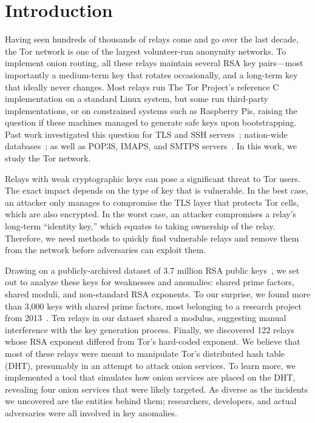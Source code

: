 \section{Introduction}
Having seen hundreds of thousands of relays come and go over the last decade,
the Tor network is one of the largest volunteer-run anonymity networks.  To
implement onion routing, all these relays maintain several RSA key pairs---most
importantly a medium-term key that rotates occasionally, and a long-term key
that ideally never changes.  Most relays run The Tor Project's reference
C implementation on a standard Linux system, but some run third-party
implementations, or on constrained systems such as Raspberry Pis, raising the
question if these machines managed to generate safe keys upon bootstrapping.
Past work investigated this question for TLS and SSH
servers~\cite{Heninger2012a}; nation-wide databases~\cite{Bernstein2013a}; as
well as POP3S, IMAPS, and SMTPS servers~\cite{Hastings2016a}.  In this work, we
study the Tor network.

Relays with weak cryptographic keys can pose a significant threat to Tor users.
The exact impact depends on the type of key that is vulnerable.  In the best
case, an attacker only manages to compromise the TLS layer that protects Tor
cells, which are also encrypted.  In the worst case, an attacker compromises a
relay's long-term ``identity key,'' which equates to taking ownership of the relay.
Therefore, we need methods to quickly find vulnerable relays and remove them
from the network before adversaries can exploit them.

Drawing on a publicly-archived dataset of 3.7 million RSA public
keys~\cite{collector}, we set out to analyze these keys for weaknesses and
anomalies: shared prime factors, shared moduli, and non-standard RSA exponents.
To our surprise, we found more than 3,000 keys with shared prime factors, most
belonging to a research project from 2013~\cite{Biryukov2013a}.  Ten relays in
our dataset shared a modulus, suggesting manual interference with the key
generation process.  Finally, we discovered 122 relays whose RSA exponent
differed from Tor's hard-coded exponent.  We believe that most of these relays
were meant to manipulate Tor's distributed hash table (DHT), presumably in an
attempt to attack onion services.  To learn more, we implemented a tool that
simulates how onion services are placed on the DHT, revealing four onion
services that were likely targeted.  As diverse as the incidents we uncovered
are the entities behind them; researchers, developers, and actual adversaries
were all involved in key anomalies.

